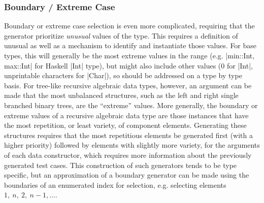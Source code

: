 \subsubsection{Boundary / Extreme Case}
Boundary or extreme case selection is even more complicated,
requiring that the generator prioritize \emph{unusual} values of the type.
This requires a definition of unusual
as well as a mechanism to identify and instantiate those values.
For base types, 
this will generally be the most extreme values in the range
(e.g. |min::Int, max::Int| for Haskell |Int| type),
but might also include other values (0 for |Int|, unprintable characters for |Char|),
so should be addressed on a type by type basis.
For tree-like recursive algebraic data types, however,
an argument can be made that the most unbalanced structures,
such as the left and right single branched binary trees,
are the ``extreme'' values.
More generally,
the boundary or extreme values of a recursive algebraic data type
are those instances that have the most repetition, or least variety, of component elements.
Generating these structures requires that the most repetitious elements be generated first
(with a higher priority)
followed by elements with slightly more variety,
for the arguments of each data constructor,
which requires more information about the previously generated test cases.
This construction of such generators tends to be type specific,
but an approximation of a boundary generator can be made using
the boundaries of an enumerated index for selection,
e.g. selecting elements $1,\ n,\ 2,\ n-1,\ldots$.
